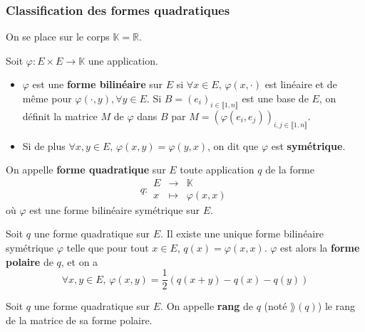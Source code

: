   \subsubsection{Classification des formes quadratiques}


  On se place sur le corps $\mathbb{K} = \mathbb{R}$.

  \begin{definition}
    Soit $\varphi : E \times E \rightarrow \mathbb{K}$ une application.
    \begin{itemize}
      \item $\varphi$ est une \textbf{forme bilinéaire} sur $E$ si $\forall x \in E, \, \varphi(x,\cdot)$ est linéaire et de même pour $\varphi(\cdot,y), \forall y \in E$. Si $B=(e_i)_{i \in \llbracket 1, n \rrbracket}$ est une base de $E$, on définit la matrice $M$ de $\varphi$ dans $B$ par $M=(\varphi(e_i,e_j))_{i,j \in \llbracket 1, n \rrbracket}$.
      \item Si de plus $\forall x, y \in E, \, \varphi(x, y) = \varphi(y, x)$, on dit que $\varphi$ est \textbf{symétrique}.
    \end{itemize}
  \end{definition}

  \begin{definition}
    On appelle \textbf{forme quadratique} sur $E$ toute application $q$ de la forme
    \[
    q :
    \begin{array}{ccc}
      E &\rightarrow& \mathbb{K} \\
      x &\mapsto& \varphi(x, x)
    \end{array}
    \]
    où $\varphi$ est une forme bilinéaire symétrique sur $E$.
  \end{definition}

  \begin{proposition}
    Soit $q$ une forme quadratique sur $E$. Il existe une unique forme bilinéaire symétrique $\varphi$ telle que pour tout $x \in E$, $q(x)=\varphi(x,x)$.
    \newpar
    $\varphi$ est alors la \textbf{forme polaire} de $q$, et on a
    \[ \forall x, y \in E, \, \varphi(x,y) = \frac{1}{2} (q(x+y) - q(x) - q(y)) \]
  \end{proposition}

  \begin{definition}
    Soit $q$ une forme quadratique sur $E$. On appelle \textbf{rang} de $q$ (noté $\rang(q)$) le rang de la matrice de sa forme polaire.
  \end{definition}

